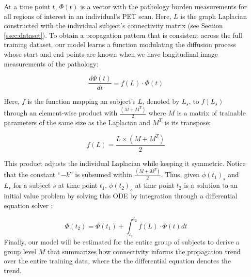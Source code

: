 \documentclass{article}
\begin{document}
At a time point $t$, $\Phi(t)$ is a vector with the pathology burden measurements
for all regions of interest in an individual's PET scan. Here, $L$ is the graph Laplacian 
constructed with the individual subject's connectivity matrix (see Section \ref{ssec:dataset}). To obtain a propagation pattern
that is consistent across the full training dataset, our model learns a function modulating the diffusion process whose 
start and end points are known when we have longitudinal 
image measurements of the pathology:

\begin{equation}
\label{eqn:eq3}
\frac{d\Phi(t)}{dt} =f(L) \cdot \Phi(t)
\end{equation}

Here, $f$ is the function mapping an subject's $L$, denoted by $L_s$, to $f(L_s)$ through an element-wise product with $\frac{(M + M^T)}{2}$ where $M$ is a matrix of trainable parameters of the same size as the Laplacian and $M^T$ is its transpose:

   \begin{equation}
   \label{eqn:eq4}
   f(L) = \frac{L \times (M + M^T)}{2}
   \end{equation}
   
This product adjusts the individual Laplacian while keeping it symmetric. Notice that the constant ``$-k$'' is subsumed within $\frac{(M + M^T)}{2}$. Thus, given $\phi(t_1)_s$ and $L_s$ for a subject $s$ at time point $t_1$, $\phi(t_2)_s$ at time point $t_2$ is a solution to an initial value problem by solving this ODE by integration through a differential equation solver \cite{chen2018neural}:

   \begin{equation}
   \label{eqn:eq5}
   \Phi(t_2) = \Phi(t_1) + \int_{t_1}^{t_2} f(L) \cdot \Phi(t) dt
   \end{equation}
   Finally, our model will be estimated for the entire group of subjects to derive a group level $M$ that
   summarizes how connectivity informs the propagation trend over the entire training data, where the the differential equation denotes the trend. 
\end{document}
